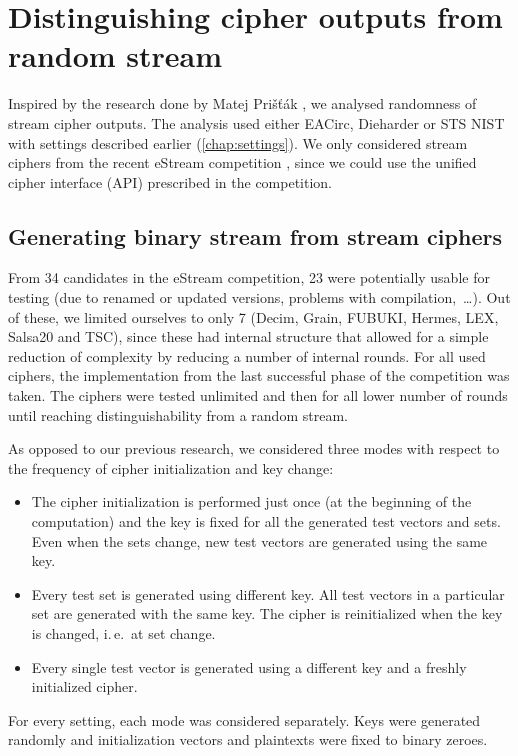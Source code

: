\documentclass[12pt,oneside]{fithesis2}		%
\renewcommand{\_}{\leavevmode \kern0.0em\vbox{\hrule width0.4em}}
\newcommand{\squarebullet}{\textcolor{black}{\raisebox{0.15em}{\rule{4pt}{4pt}}}}
\newenvironment{myItemize}{
  \begin{itemize}[leftmargin=2em,rightmargin=1em,itemsep=\parskip ,parsep=0em,topsep=0em,partopsep=0em]
  \renewcommand{\labelitemi}{\squarebullet}
  \renewcommand{\labelitemii}{$\diamond$}
}{
  \end{itemize}
}
\begin{document}
\chapter{Distinguishing cipher outputs from random stream}
\label{chap:distinguish-cipher}

Inspired by the research done by Matej Prišťák \parencite{thesis-pristak}, we analysed randomness of stream cipher outputs.
The analysis used either EACirc, Dieharder or STS NIST with settings described earlier (\autoref{chap:settings}).
We only considered stream ciphers from the recent eStream competition \parencite{estream-competition},
since we could use the unified cipher interface (API) prescribed in the competition.

\section{Generating binary stream from stream ciphers}
\label{sec:estream-settings}

From 34 candidates in the eStream competition, 23 were potentially usable for testing (due to renamed or updated versions, 
problems with compilation,~\dots). Out of these, we limited ourselves to only 7 (Decim, Grain, FUBUKI, Hermes, LEX, Salsa20 and TSC),
since these had internal structure that allowed for a simple reduction of complexity by reducing a number of internal rounds.
For all used ciphers, the implementation from the last successful phase of the competition was taken. 
The ciphers were tested unlimited and then for all lower number of rounds until reaching distinguishability from a random stream.

As opposed to our previous research, we considered three modes with respect to the frequency of cipher initialization and key change:
\begin{myItemize}
\item The cipher initialization is performed just once (at the beginning of the computation) and the key is fixed for
all the generated test vectors and sets. Even when the sets change, new test vectors are generated using the same key.
\item Every test set is generated using different key. All test vectors in a particular set are generated with the same key.
The cipher is reinitialized when the key is changed, i.\,e.\ at set change.
\item Every single test vector is generated using a different key and a freshly initialized cipher.
\end{myItemize}
For every setting, each mode was considered separately. Keys were generated randomly and initialization vectors and plaintexts
were fixed to binary zeroes.
\end{document}
